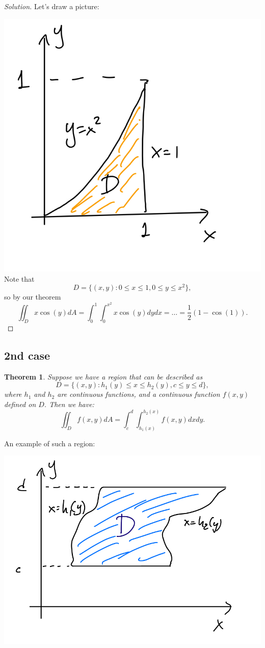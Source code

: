 \documentclass[12pt]{article}
\newenvironment{solution}
  {\begin{proof}[Solution]}
  {\end{proof}}
\newtheorem{theorem}{Theorem}
\begin{document}
\begin{solution}
Let's draw a picture: 

\includegraphics[scale=.2]{example.jpeg}
Note that $$D=\{ (x,y):0\leq x \leq 1, 0\leq y\leq x^2\},$$ so by our theorem$$\iint_D x\cos(y) dA=\int_0^1\int_0^{x^2} x\cos(y)dy dx=\dots=\frac{1}{2}(1-\cos(1)).$$

\end{solution}


\subsection*{2nd case}
\begin{theorem} Suppose we have a region that can be described as $$D=\{ (x,y): h_1(y)\leq x\leq h_2(y), c\leq y\leq d \},$$ where $h_1$ and $h_2$ are continuous functions, and a continuous function $f(x,y)$ defined on $D$. Then we have: $$\iint_D f(x,y) dA =\int_c^d \int_{h_1(x)}^{h_2(x)} f(x,y)dx dy.$$
\end{theorem}
An example of such a region:

\includegraphics[scale=.2]{type_2.jpeg}
\end{document}
